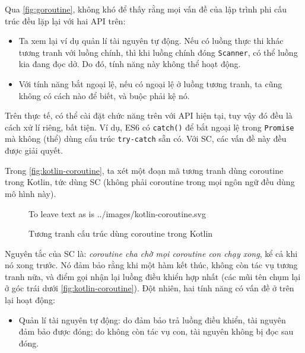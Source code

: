 \documentclass[../../thesis]{subfiles}
\begin{document}
Qua \autoref{fig:goroutine}, không khó để thấy rằng mọi vấn đề của lập trình phi
cấu trúc đều lặp lại với hai API trên:

\begin{itemize}
    \item
        Ta xem lại ví dụ quản lí tài nguyên tự động. Nếu có luồng thực thi khác
        tương tranh với luồng chính, thì khi luồng chính đóng \texttt{Scanner},
        có thể luồng kia đang đọc dở. Do đó, tính năng này không thể hoạt động.
\end{itemize}

\begin{itemize}[resume, before = \vspace*{-\dimexpr\topsep+\partopsep\relax}]
    \item
        Với tính năng bắt ngoại lệ, nếu có ngoại lệ ở luồng tương tranh, ta cũng
        không có cách nào để biết, và buộc phải kệ nó.
\end{itemize}

Trên thực tế, có thể cài đặt chức năng trên với API hiện tại, tuy vậy đó đều là
cách xử lí riêng, bất tiện. Ví dụ, ES6 có \texttt{catch()} để bắt ngoại lệ trong
\texttt{Promise} mà không (thể) dùng cấu trúc \texttt{try-catch} sẵn có. Với SC,
các vấn đề này đều được giải quyết.

Trong \autoref{fig:kotlin-coroutine}, ta xét một đoạn mã tương tranh dùng
coroutine trong Kotlin, tức dùng SC (không phải coroutine trong mọi ngôn ngữ đều
dùng mô hình này).

\begin{figure}
    \centering
    \vspace*{-6mm}
     To leave text as is
        {../images/kotlin-coroutine.svg}                 %
    \vspace*{-10mm}
    \caption{Tương tranh cấu trúc dùng coroutine trong Kotlin \cite{NJS_SC}}
    \label{fig:kotlin-coroutine}
\end{figure}

Nguyên tắc của SC là: \emph{coroutine cha chờ mọi coroutine con chạy xong}, kể
cả khi nó xong trước. Nó đảm bảo rằng khi một hàm kết thúc, không còn tác vụ
tương tranh nữa, và điểm gọi nhận lại luồng điều khiển hợp nhất (các mũi tên
chụm lại ở góc trái dưới \autoref{fig:kotlin-coroutine}). Đột nhiên, hai tính
năng có vấn đề ở trên lại hoạt động:

\begin{itemize}
    \item
        Quản lí tài nguyên tự động: do đảm bảo trả luồng điều khiển, tài nguyên
        đảm bảo được đóng; do không còn tác vụ con, tài nguyên không bị đọc sau
        đóng.
\end{itemize}
\end{document}
